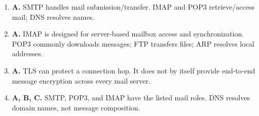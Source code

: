 \begin{enumerate}[label=\textbf{Q\arabic*.}, leftmargin=*]
\item \textbf{A.} SMTP handles mail submission/transfer. IMAP and POP3 retrieve/access mail; DNS resolves names.

\item \textbf{A.} IMAP is designed for server-based mailbox access and synchronization. POP3 commonly downloads messages; FTP transfers files; ARP resolves local addresses.

\item \textbf{A.} TLS can protect a connection hop. It does not by itself provide end-to-end message encryption across every mail server.

\item \textbf{A, B, C.} SMTP, POP3, and IMAP have the listed mail roles. DNS resolves domain names, not message composition.

\end{enumerate}
